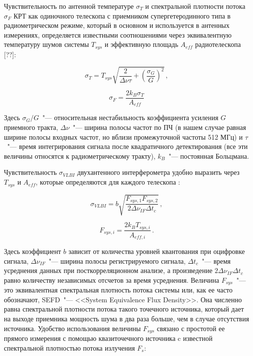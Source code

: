 Чувствительность по антенной температуре $\sigma_T$
и спектральной плотности потока $\sigma_F$ КРТ как одиночного телескопа с приемником
супергетеродинного типа в радиометрическом режиме, который в основном и используется в антенных
измерениях, определяется известными соотношениями через
эквивалентную температуру шумов системы $T_{sys}$ и
эффективную площадь $A_{eff}$ радиотелескопа [??]:

\begin{equation}
 \sigma_T = T_{sys} \sqrt{\frac{2}{\Delta\nu \tau} + \left(\frac{\sigma_G}{G}\right)^2}\,,
\end{equation}

\begin{equation}
 \sigma_F = \frac{2 k_B \sigma_T}{A_{eff}}
\end{equation}

Здесь $\sigma_G/G$~"--- относительная нестабильность коэффициента усиления $G$ приемного тракта,
$\Delta \nu$~"--- ширина полосы частот по ПЧ (в нашем случае
равная ширине полосы входных частот, но вблизи
промежуточной частоты 512 МГц) и $\tau$~"--- время интегрирования сигнала после квадратичного
детектирования (все эти величины относятся к радиометрическому тракту), $k_B$~"--- постоянная
Больцмана.

Чувствительность $\sigma_{VLBI}$ двухантенного интерферометра
удобно выразить через $T_{sys}$ и $A_{eff}$, которые определяются для каждого телескопа
\cite{VLBIbook}:

\begin{equation}
 \sigma_{VLBI} = b \sqrt{\frac{F_{sys,1}F_{sys,2}}{2 \Delta \nu_{IF} \Delta t_c}}\,,
\end{equation}

\begin{equation}
 F_{sys,i} = \frac{2 k_B T_{sys,i}}{A_{eff,i}} \,.
\end{equation}

Здесь коэффициент $b$ зависит от количества уровней квантования при оцифровке сигнала, $\Delta
\nu_{IF}$~"--- ширина полосы регистрируемого сигнала, $\Delta t_c$~"--- время усреднения данных при
посткорреляционном анализе, а произведение $2 \Delta \nu_{IF} \Delta t_c$ равно количеству
независимых отсчетов за время усреднения. Величина $F_{sys}$~"--- это эквивалентная спектральная
плотность потока системы или, как ее часто обозначают, SEFD~"--- <<System Equivalence Flux
Density>>.
Она численно равна спектральной плотности потока такого точечного источника, который дает
на выходе приемника мощность шума в два раза больше, чем в случае отсутствия источника. Удобство
использования величины $F_{sys}$ связано с простотой ее прямого измерения с помощью квазиточечного
источника c известной спектральной плотностью потока излучения $F_s$:

